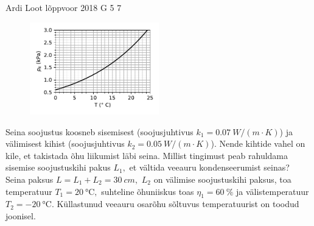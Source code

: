 \documentclass[11pt, twoside]{article}
\begin{document}
{{
\fi
}

{Ardi Loot} %
{lõppvoor} %
{2018} %
{G 5} %
{7} %
{
\ifStatement
\begin{figure}
\vspace{-30pt}
\begin{center}
\includegraphics[width=0.5\textwidth]{2018-v3g-05-kullastunud-aur}
\par\end{center} 
\end{figure}

Seina soojustus koosneb sisemisest (soojusjuhtivus $k_{1}=\SI{0.07}{W/\left(m\cdot K\right)}$)
ja välimisest kihist (soojusjuhtivus $k_{2}=\SI{0.05}{W/\left(m\cdot K\right)}$).
Nende kihtide vahel on kile, et takistada õhu liikumist läbi seina.
Millist tingimust peab rahuldama sisemise soojustuskihi pakus $L_{1},$
et vältida veeauru kondenseerumist seinas? Seina paksus $L=L_{1}+L_{2}=\SI{30}{cm},$
$L_{2}$ on välimise soojustuskihi paksus, toa temperatuur $T_{1}=\SI{20}{\celsius},$
suhteline õhuniiskus toas $\eta_{1}=\SI{60}{\percent}$ ja välistemperatuur
$T_{2}=\SI{-20}{\celsius}.$ Küllastunud veeauru osarõhu sõltuvus
temperatuurist on toodud joonisel.

}}
\end{document}

